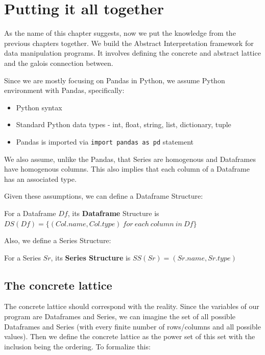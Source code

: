 \chapter{Putting it all together}\label{ch:putting-it-all-together} %

As the name of this chapter suggests, now we put the knowledge from the previous chapters together.
We build the Abstract Interpretation framework for data manipulation programs.
It involves defining the concrete and abstract lattice and the galois connection between.

Since we are mostly focusing on Pandas in Python, we assume Python environment with Pandas, specifically:

\begin{itemize}
    \item Python syntax
    \item Standard Python data types - int, float, string, list, dictionary, tuple
    \item Pandas is imported via \verb|import pandas as pd| statement
\end{itemize}

We also assume, unlike the Pandas, that Series are homogenous and Dataframes have homogenous columns.
This also implies that each column of a Dataframe has an associated type.

Given these assumptions, we can define a Dataframe Structure:

\begin{defn}
    For a Dataframe $Df$, its \textbf{Dataframe} Structure is $DS(Df) = \{(Col.name, Col.type) \: for \: each \: column \: in \: Df\}$
\end{defn}

Also, we define a Series Structure:

\begin{defn}
    For a Series $Sr$, its \textbf{Series Structure} is $SS(Sr) = (Sr.name, Sr.type)$
\end{defn}


\section{The concrete lattice}

The concrete lattice should correspond with the reality.
Since the variables of our program are Dataframes and Series, we can imagine the set of all possible Dataframes and
Series (with every finite number of rows/columns and all possible values).
Then we define the concrete lattice as the power set of this set with the inclusion being the ordering. %
To formalize this:

